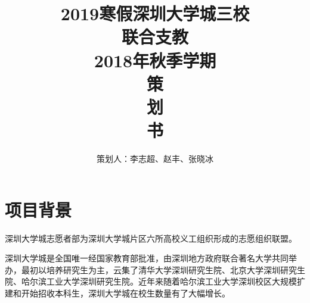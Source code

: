 \documentclass[12pt]{ctexart}
\begin{document}
\title{
    \vspace{-0.5in}
    \textmd{\textbf{\huge{2019寒假深圳大学城三校\\ 联合支教}}}\\
    \normalsize\vspace{0.1in}\Large{2018年秋季学期}\\
    \vspace{1in}
     \textbf{\huge{策}}\\
    \vspace{1in}
     \textbf{\huge{划}}\\
    \vspace{1in}
     \textbf{\huge{书}}\\
    \vspace{1in}
}
\author{策划人：李志超、赵丰、张晓冰}
\maketitle
\thispagestyle{empty}
\pagebreak
\pagestyle{runningpage}
\tableofcontents





\section{项目背景}
深圳大学城志愿者部为深圳大学城片区六所高校义工组织形成的志愿组织联盟。

深圳大学城是全国唯一经国家教育部批准，由深圳地方政府联合著名大学共同举办，最初以培养研究生为主，云集了清华大学深圳研究生院、北京大学深圳研究生院、哈尔滨工业大学深圳研究生院。近年来随着哈尔滨工业大学深圳校区大规模扩建和开始招收本科生，深圳大学城在校生数量有了大幅增长。

\end{document}
